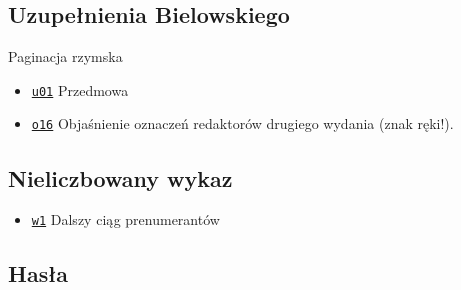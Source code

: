 \documentclass[12]{mwart}
\begin{document}
\subsection{Uzupełnienia  Bielowskiego}
\label{sec:uzup-biel}

Paginacja rzymska

\begin{itemize}
\item \href{\paii{2}{11}}{\texttt{u01}}  Przedmowa
\item \href{\paii{2}{16}}{\texttt{o16}}  Objaśnienie oznaczeń redaktorów drugiego wydania (znak ręki!).
\end{itemize}

\subsection{Nieliczbowany wykaz}
\label{sec:nieliczbowany-wykaz}

\begin{itemize}
\item \href{\paii{2}{17}}{\texttt{w1}}  Dalszy ciąg prenumerantów
\end{itemize}

\subsection{Hasła}
\label{sec:hasa}
\end{document}
